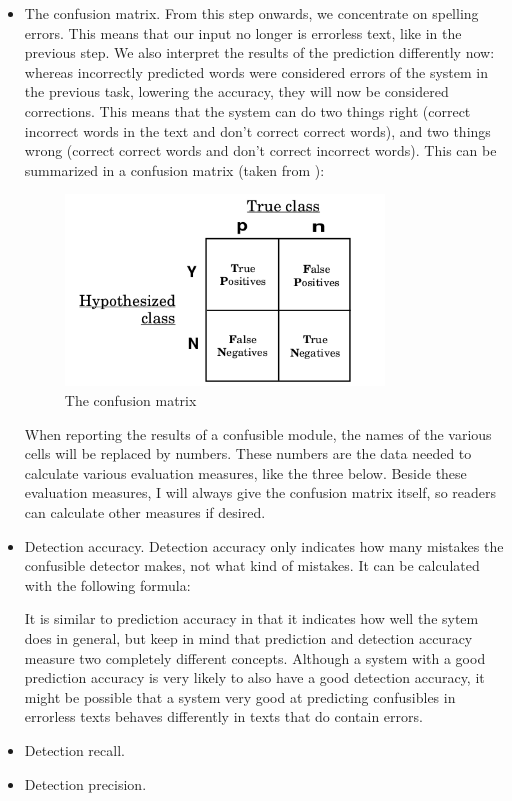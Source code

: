 \documentclass[12pt]{article}
\begin{document}
\begin{itemize}
\item The confusion matrix. From this step onwards, we concentrate on spelling errors. This means that our input no longer is errorless text, like in the previous step. We also interpret the results of the prediction differently now: whereas incorrectly predicted words were considered errors of the system in the previous task, lowering the accuracy, they will now be considered corrections. This means that the system can do two things right (correct incorrect words in the text and don't correct correct words), and two things wrong (correct correct words and don't correct incorrect words). This can be summarized in a confusion matrix (taken from \citet{fawcett04}):

\begin{figure}[htb]
\centering
\includegraphics[width=0.8\textwidth]{confusion_matrix.png}
\caption{The confusion matrix}
\label{fig:confusion}
\end{figure}

When reporting the results of a confusible module, the names of the various cells will be replaced by numbers. These numbers are the data needed to calculate various evaluation measures, like the three below. Beside these evaluation measures, I will always give the confusion matrix itself, so readers can calculate other measures if desired.

\item Detection accuracy. Detection accuracy only indicates how many mistakes the confusible detector makes, not what kind of mistakes. It can be calculated with the following formula:


It is similar to prediction accuracy in that it indicates how well the sytem does in general, but keep in mind that prediction and detection accuracy measure two completely different concepts. Although a system with a good prediction accuracy is very likely to also have a good detection accuracy, it might be possible that a system very good at predicting confusibles in errorless texts behaves differently in texts that do contain errors.
 
\item Detection recall.
\item Detection precision.
\end{itemize}
\end{document}
